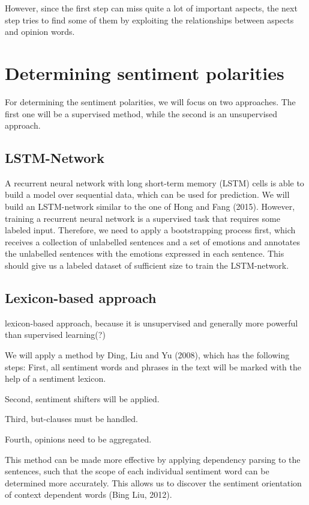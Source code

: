 \documentclass[10pt,a4paper]{article}
\begin{document}
	However, since the first step can miss quite a lot of important aspects, the next step tries to find some of them by exploiting the relationships between aspects and opinion words.
	
	\section{Determining sentiment polarities}
	For determining the sentiment polarities, we will focus on two approaches. The first one will be a supervised method, while the second is an unsupervised approach.
	
		\subsection{LSTM-Network}
		A recurrent neural network with long short-term memory (LSTM) cells is able to build a model over sequential data, which can be used for prediction. We will build an LSTM-network similar to the one of Hong and Fang (2015). However, training a recurrent neural network is a supervised task that requires some labeled input. Therefore, we need to apply a bootstrapping process first, which receives a collection of unlabelled sentences and a set of emotions and annotates the unlabelled sentences with the emotions expressed in each sentence. This should give us a labeled dataset of sufficient size to train the LSTM-network.
		
		\subsection{Lexicon-based approach}
		lexicon-based approach, because it is unsupervised and generally more powerful than supervised learning(?)
		
		We will apply a method by Ding, Liu and Yu (2008), which has the following steps: First, all sentiment words and phrases in the text will be marked with the help of a sentiment lexicon.
		
		Second, sentiment shifters will be applied.
		
		Third, but-clauses must be handled.
		
		Fourth, opinions need to be aggregated.
	
		This method can be made more effective by applying dependency parsing to the sentences, such that the scope of each individual sentiment word can be determined more accurately. This allows us to discover the sentiment orientation of context dependent words (Bing Liu, 2012).
\end{document}
